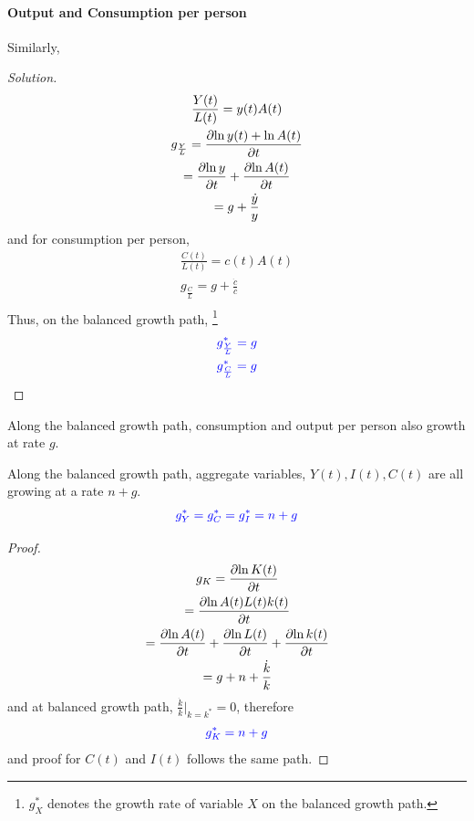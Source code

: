 \documentclass[]{article}
\begin{document}
			\paragraph{Output and Consumption per person} Similarly,
			\begin{proof}[Solution]
				\begin{gather*}
					\frac{Y(t)}{L(t)} = y(t)A(t) \\
					g_{\frac{Y}{L}} = \frac{\partial{\ln{y(t)} + \ln{A(t)}}}{\partial{t}} \\
					= \frac{\partial{\ln{y}}}{\partial{t}} + \frac{\partial{\ln{A(t)}}}{\partial{t}} \\
					= g + \frac{\dot{y}}{y}
				\end{gather*}
				and for consumption per person,
				\begin{gather*}
					\frac{C(t)}{L(t)} = c(t)A(t)\\
					g_{\frac{C}{L}} = g + \frac{\dot{c}}{c} \\
				\end{gather*}
				Thus, on the balanced growth path, \footnote{$g_X^*$ denotes the growth rate of variable $X$ on the balanced growth path.}
				\begin{gather}
					\textcolor{blue}{
						g_{\frac{Y}{L}}^* = g
					}
					\\
					\textcolor{blue}{
						g_{\frac{C}{L}}^* = g
					}
				\end{gather}
			\end{proof}
			
			\begin{proposition}
				Along the balanced growth path, consumption and output per person also growth at rate $g$.
			\end{proposition}
			
			\begin{proposition}
				Along the balanced growth path, aggregate variables, $Y(t), I(t), C(t)$ are all growing at a rate $n + g$.
				\begin{equation}
					\textcolor{blue}{
						g_{Y}^* = g_{C}^* = g_{I}^* = n + g
						}
				\end{equation}
			\end{proposition}
			\begin{proof}
				\begin{gather*}
				g_{K} = \frac{\partial{\ln{K(t)}}}{\partial{t}} \\
				= \frac{\partial{\ln{A(t)L(t)k(t)}}}{\partial{t}} \\
				= \frac{\partial{\ln{A(t)}}}{\partial{t}} + \frac{\partial{\ln{L(t)}}}{\partial{t}} + \frac{\partial{\ln{k(t)}}}{\partial{t}} \\
				= g + n + \frac{\dot{k}}{k}
				\end{gather*}
				and at balanced growth path, $\frac{\dot{k}}{k}|_{k=k^*} = 0$, therefore 
				\begin{equation}
					\textcolor{blue}{
						g_K^* = n + g
					}
				\end{equation}
				and proof for $C(t)$ and $I(t)$ follows the same path.
			\end{proof}
		
\end{document}
